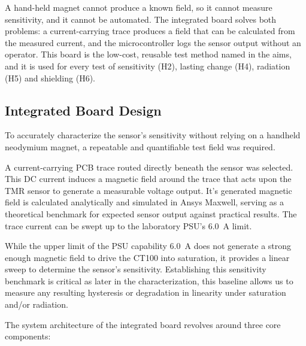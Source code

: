 \documentclass[12pt,a4paper]{article}
\begin{document}
A hand-held magnet cannot produce a known field, so it cannot measure sensitivity, and it cannot be automated. The integrated board solves both problems: a current-carrying trace produces a field that can be calculated from the measured current, and the microcontroller logs the sensor output without an operator. This board is the low-cost, reusable test method named in the aims, and it is used for every test of sensitivity (H2), lasting change (H4), radiation (H5) and shielding (H6).

\subsection{Integrated Board Design}
\label{sec:integrated-design}

To accurately characterize the sensor's sensitivity without relying on a handheld neodymium magnet, a repeatable and quantifiable test field was required.

A current-carrying PCB trace routed directly beneath the sensor was selected. This DC current induces a magnetic field around the trace that acts upon the TMR sensor to generate a measurable voltage output. It's generated magnetic field is calculated analytically and simulated in Ansys Maxwell, serving as a theoretical benchmark for expected sensor output against practical results. The trace current can be swept up to the laboratory PSU's \SI{6.0}{\ampere} limit. 

While the upper limit of the PSU capability \SI{6.0}{\ampere}  does not generate a strong enough magnetic field to drive the CT100 into saturation, it provides a linear sweep to determine the sensor's sensitivity. Establishing this sensitivity benchmark is critical as later in the characterization, this baseline allows us to measure any resulting hysteresis or degradation in linearity under saturation and/or radiation.

The system architecture of the integrated board revolves around three core components:
\end{document}
